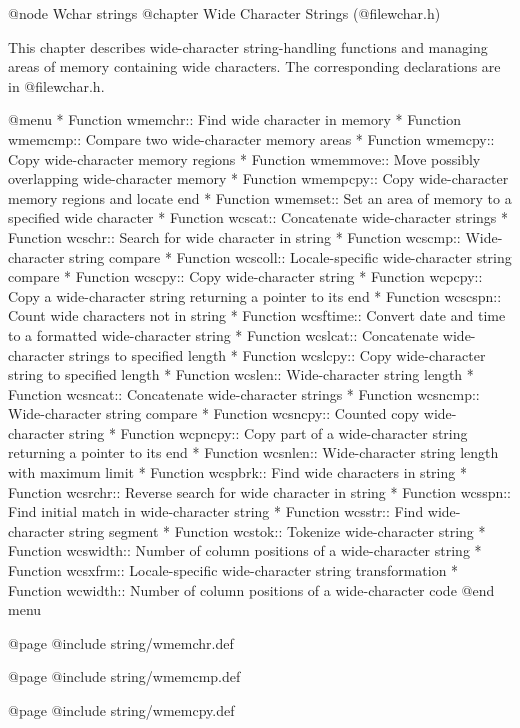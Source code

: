 @node Wchar strings
@chapter Wide Character Strings (@file{wchar.h})

This chapter describes wide-character string-handling functions and
managing areas of memory containing wide characters.  The corresponding
declarations are in @file{wchar.h}.

@menu
* Function wmemchr::     Find wide character in memory
* Function wmemcmp::     Compare two wide-character memory areas
* Function wmemcpy::     Copy wide-character memory regions
* Function wmemmove::    Move possibly overlapping wide-character memory
* Function wmempcpy::    Copy wide-character memory regions and locate end
* Function wmemset::     Set an area of memory to a specified wide character
* Function wcscat::      Concatenate wide-character strings
* Function wcschr::      Search for wide character in string
* Function wcscmp::      Wide-character string compare
* Function wcscoll::     Locale-specific wide-character string compare
* Function wcscpy::      Copy wide-character string
* Function wcpcpy::      Copy a wide-character string returning a pointer to its end
* Function wcscspn::     Count wide characters not in string
* Function wcsftime::    Convert date and time to a formatted wide-character string
* Function wcslcat::     Concatenate wide-character strings to specified length
* Function wcslcpy::     Copy wide-character string to specified length
* Function wcslen::      Wide-character string length
* Function wcsncat::     Concatenate wide-character strings
* Function wcsncmp::     Wide-character string compare
* Function wcsncpy::     Counted copy wide-character string
* Function wcpncpy::     Copy part of a wide-character string returning a pointer to its end
* Function wcsnlen::     Wide-character string length with maximum limit
* Function wcspbrk::     Find wide characters in string
* Function wcsrchr::     Reverse search for wide character in string
* Function wcsspn::      Find initial match in wide-character string
* Function wcsstr::      Find wide-character string segment
* Function wcstok::      Tokenize wide-character string
* Function wcswidth::    Number of column positions of a wide-character string
* Function wcsxfrm::     Locale-specific wide-character string transformation
* Function wcwidth::     Number of column positions of a wide-character code
@end menu

@page
@include string/wmemchr.def

@page
@include string/wmemcmp.def

@page
@include string/wmemcpy.def

